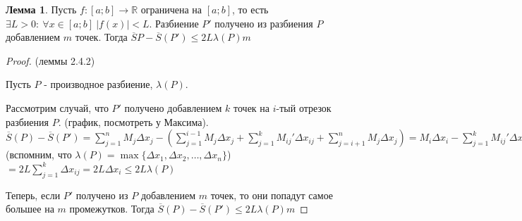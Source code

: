 \documentclass{report}
\theoremstyle{definition}
\newtheorem{lemma}{Лемма}[section]
\begin{document}
\begin{lemma}
  Пусть $f:[a;b]\rightarrow\mathbb{R}$ ограничена на $[a;b]$, то есть $\exists L > 0: \ \forall x \in [a;b]
  \ | f(x) | < L$. Разбиение $P'$ получено из разбиения $P$ добавлением $m$ точек. Тогда $\overline{S}{P}
  - \overline{S}(P') \leqslant 2L\lambda(P)m$
\end{lemma}

\begin{proof}
  (леммы 2.4.2)

  Пусть $P$ - производное разбиение, $\lambda(P)$.

  Рассмотрим случай, что $P'$ получено добавлением $k$ точек на $i$-тый отрезок разбиения $P$. (график,
  посмотреть у Максима). $\overline{S}(P) - \overline{S}(P') = \sum_{j=1}^{n}M_{j}\Delta x_{j} - 
  (\sum_{j=1}^{i-1}M_{j}\Delta x_{j} + \sum_{j = 1}^{k}M_{ij}'\Delta x_{ij} + \sum_{j=i+1}^{n}
  M_{j}\Delta x_{j}) = M_{i}\Delta x_{i} - \sum_{j = 1}^{k}M_{ij}'\Delta x_{ij} = M_{i}\sum_{j=1}^{k}
  \Delta x_{ij} - \sum_{j=1}^{k}M_{ij}'\Delta x_{ij} = \sum_{j=1}^{k}M_{i}\Delta x_{ij} - \sum_{j=1}^{k}
  M_{ij}'\Delta x_{ij} = \sum_{j=1}^{k}(M_{i} - M_{ij}')\Delta x_{ij} \leqslant \sum_{j=1}^{k}2L\Delta x_{ij}
  =$ (вспомним, что $\lambda(P)=\max\{\Delta x_{1},\Delta x_{2},\ldots,\Delta x_{n}\}$) $=2L\sum_{j=1}^{k}
  \Delta x_{ij} = 2L\Delta x_{i} \leqslant 2L\lambda(P)$

  Теперь, если $P'$ получено из $P$ добавлением $m$ точек, то они попадут самое большее на $m$ промежутков.
  Тогда $\overline{S}(P) - \overline{S}(P') \leqslant 2L\lambda (P)m$
\end{proof}
\end{document}
